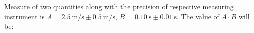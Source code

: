 Measure of two quantities along with the precision of respective 
measuring instrument is 
$A = 2.5 \ \text{m}/\text{s} \pm 0.5 \ \text{m}/\text{s}$, 
$B = 0.10 \ \text{s} \pm 0.01 \ \text{s}$.
The value of $A \cdot B$ will be:
